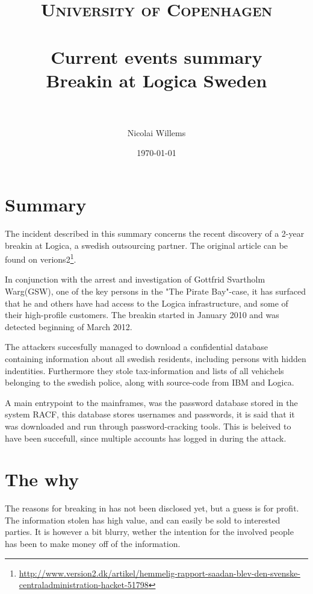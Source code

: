 \documentclass[paper=a4, fontsize=11pt]{scrartcl} %
\title{	
\normalfont \normalsize 
\textsc{University of Copenhagen} \\ [25pt] %
\horrule{0.5pt} \\[0.4cm] %
\huge Current events summary\\ %
\Large Breakin at Logica Sweden\\ %
\horrule{2pt} \\[0.5cm] %
}
\author{Nicolai Willems} %
\date{\normalsize\today} %
\numberwithin{equation}{section} %
\numberwithin{figure}{section} %
\numberwithin{table}{section} %
\begin{document}
\maketitle %


\section{Summary}
The incident described in this summary concerns the recent discovery of a
2-year breakin at Logica, a swedish outsourcing partner. The original article
can be found on
verions2\footnote{
\href{http://www.version2.dk/artikel/hemmelig-rapport-saadan-blev-den-svenske-centraladministration-hacket-51798}
     {http://www.version2.dk/artikel/hemmelig-rapport-saadan-blev-den-svenske-centraladministration-hacket-51798}}.

In conjunction with the arrest and investigation of Gottfrid Svartholm
Warg(GSW), one of the key persons in the "The Pirate Bay"-case, it has surfaced
that he and others have had access to the Logica infrastructure, and some of
their high-profile customers. The breakin started in January 2010 and was
detected beginning of March 2012. 

The attackers succesfully managed to download a confidential database
containing information about all swedish residents, including persons with
hidden indentities. Furthermore they stole tax-information and lists of all
vehichels belonging to the swedish police, along with source-code from IBM and
Logica.

A main entrypoint to the mainframes, was the password database stored in the
system RACF, this database stores usernames and passwords, it is said that it
was downloaded and run through password-cracking tools. This is beleived to
have been succefull, since multiple accounts has logged in during the attack.

\section{The why}
The reasons for breaking in has not been disclosed yet, but a guess is
for profit. The information stolen has high value, and can easily be sold to
interested parties. It is however a bit blurry, wether the intention for the
involved people has been to make money off of the information.
\end{document}
